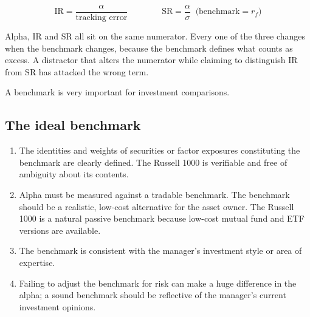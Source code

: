 \begin{imfmlbox}
\[ \text{IR} = \frac{\alpha}{\text{tracking error}}
   \qquad\qquad
   \text{SR} = \frac{\alpha}{\sigma} \;\;\text{(benchmark} = r_f) \]
\end{imfmlbox}

\begin{imtrapbox}[breakable=false,title={The denominator is the discriminator}]
Alpha, IR and SR all sit on the same numerator. Every one of the three changes
when the benchmark changes, because the benchmark defines what counts as excess.
A distractor that alters the numerator while claiming to distinguish IR from SR
has attacked the wrong term.
\end{imtrapbox}


A benchmark is very important for investment comparisons. 

\subsection{The ideal benchmark}

\begin{enumerate}
\item {} The identities and weights of securities or factor
exposures constituting the benchmark are clearly defined. The Russell 1000 is
verifiable and free of ambiguity about its contents.
\item {} Alpha must be measured against a tradable benchmark. The
benchmark should be a realistic, low-cost alternative for the asset owner. The
Russell 1000 is a natural passive benchmark because low-cost mutual fund and ETF
versions are available.
\item {} The benchmark is consistent with the manager's
investment style or area of expertise.
\item {} Failing to adjust the benchmark for risk can make
a huge difference in the alpha; a sound benchmark should be reflective of the
manager's current investment opinions.
\end{enumerate}

